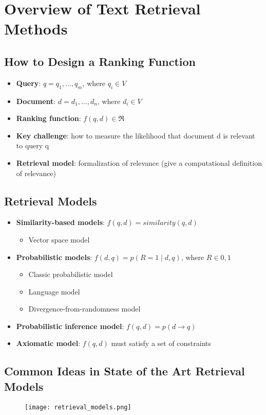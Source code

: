 \section{Overview of Text Retrieval Methods}

\subsection{How to Design a Ranking Function}
\begin{itemize}
\item \textbf{Query}: $q = q_1,\dots ,q_m$, where $q_i \in V$
\item \textbf{Document}: $d = d_1,\dots ,d_n$, where $d_i \in V$
\item \textbf{Ranking function}: $f(q,d) \in \Re$
\item \textbf{Key challenge}: how to measure the likelihood that document d is relevant to query q
\item \textbf{Retrieval model}: formalization of relevance (give a computational definition of relevance)
\end{itemize}


\subsection{Retrieval Models}
\begin{itemize}
\item \textbf{Similarity-based models}: $f(q,d) = similarity(q,d)$
    \begin{itemize}
    \item Vector space model
    \end{itemize}
\item \textbf{Probabilistic models}: $f(d,q) = p(R=1 \mid d,q)$, where $R \in {0,1}$ 
    \begin{itemize}       
    \item Classic probabilistic model
    \item Language model
    \item Divergence-from-randomness model    
    \end{itemize}
\item \textbf{Probabilistic inference model}: $f(q,d) = p(d \rightarrow q)$
\item \textbf{Axiomatic model}: $f(q,d)$ must satisfy a set of constraints
\end{itemize}    


\subsection{Common Ideas in State of the Art Retrieval Models}
\begin{figure}[H]
    \centering
    \texttt{[image: retrieval\_models.png]}
\end{figure}

